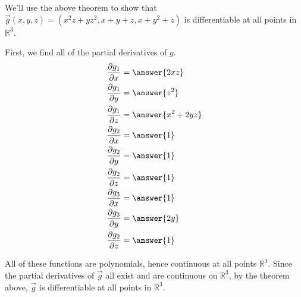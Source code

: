 \documentclass{ximera}
\begin{document}
\begin{example}
We'll use the above theorem to show that $\vec{g}(x,y,z) = (x^2z+yz^2, x+y+z, x+y^2+z)$ is differentiable at all points in $\mathbb{R}^3$.

First, we find all of the partial derivatives of $g$.
\begin{align*}
\frac{\partial g_1}{\partial x} &= \answer{2xz}\\
\frac{\partial g_1}{\partial y} &= \answer{z^2}\\
\frac{\partial g_1}{\partial z} &= \answer{x^2+2yz}\\
\frac{\partial g_2}{\partial x} &= \answer{1}\\
\frac{\partial g_2}{\partial y} &= \answer{1}\\
\frac{\partial g_2}{\partial z} &= \answer{1}\\
\frac{\partial g_3}{\partial x} &= \answer{1}\\
\frac{\partial g_3}{\partial y} &= \answer{2y}\\
\frac{\partial g_2}{\partial z} &= \answer{1}\\
\end{align*}

All of these functions are polynomials, hence continuous at all points $\mathbb{R}^3$. Since the partial derivatives of $\vec{g}$ all exist and are continuous on $\mathbb{R}^3$, by the theorem above, $\vec{g}$ is differentiable at all points in $\mathbb{R}^3$.
\end{example}
\end{document}

